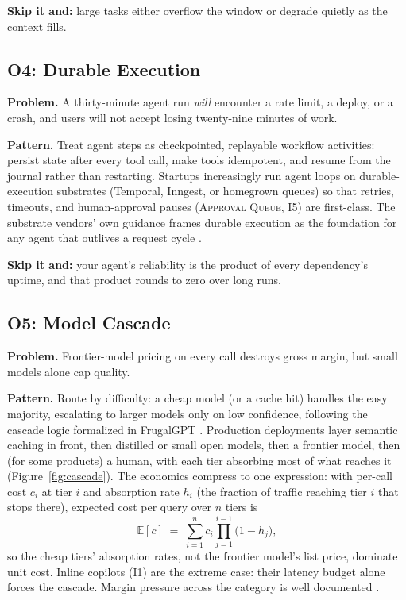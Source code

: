 \documentclass[11pt]{article}
\newcommand{\pat}[1]{\textsc{#1}}
\begin{document}
\textbf{Skip it and:} large tasks either overflow the window or degrade
quietly as the context fills.

\subsection{O4: Durable Execution}

\textbf{Problem.} A thirty-minute agent run \emph{will} encounter a rate
limit, a deploy, or a crash, and users will not accept losing twenty-nine
minutes of work.

\textbf{Pattern.} Treat agent steps as checkpointed, replayable workflow
activities: persist state after every tool call, make tools idempotent, and
resume from the journal rather than restarting. Startups increasingly run
agent loops on durable-execution substrates (Temporal, Inngest, or
homegrown queues) so that retries, timeouts, and human-approval pauses
(\pat{Approval Queue}, I5) are first-class. The substrate vendors' own
guidance frames durable execution as the foundation for any agent that
outlives a request cycle \citep{temporal2025durable, inngest2026durable}.

\textbf{Skip it and:} your agent's reliability is the product of every
dependency's uptime, and that product rounds to zero over long runs.

\subsection{O5: Model Cascade}

\textbf{Problem.} Frontier-model pricing on every call destroys gross margin,
but small models alone cap quality.

\textbf{Pattern.} Route by difficulty: a cheap model (or a cache hit) handles
the easy majority, escalating to larger models only on low confidence,
following the cascade logic formalized in FrugalGPT \citep{chen2023frugalgpt}.
Production deployments layer semantic caching in front, then distilled or
small open models, then a frontier model, then (for some products) a human,
with each tier absorbing most of what reaches it (Figure~\ref{fig:cascade}).
The economics compress to one expression: with per-call cost $c_i$ at tier
$i$ and absorption rate $h_i$ (the fraction of traffic reaching tier $i$ that
stops there), expected cost per query over $n$ tiers is
\begin{equation}
\mathbb{E}[c] \;=\; \sum_{i=1}^{n} c_i \prod_{j=1}^{i-1}\bigl(1-h_j\bigr),
\label{eq:cascade}
\end{equation}
so the cheap tiers' absorption rates, not the frontier model's list price,
dominate unit cost. Inline copilots (I1) are the extreme case: their latency
budget alone forces the cascade. Margin pressure across the category is well
documented \citep{bvp2026pricing}.
\end{document}

